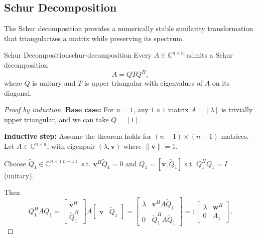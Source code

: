 \subsection{Schur Decomposition}

The Schur decomposition provides a numerically stable similarity transformation that triangularizes a matrix while preserving its spectrum.

\begin{theorem}{Schur Decomposition}{schur-decomposition}
    Every $A \in \mathbb{C}^{n \times n}$ admits a Schur decomposition
    \[
        A = Q T Q^H,
    \]
    where $Q$ is unitary and $T$ is upper triangular with eigenvalues of $A$ on its diagonal.
\end{theorem}

\begin{proof}[Proof by induction]

    \textbf{Base case:}
    For $n=1$, any $1 \times 1$ matrix $A = [\lambda]$ is trivially upper triangular, and we can take $Q = [1]$.

    \textbf{Inductive step:}
    Assume the theorem holds for $(n-1) \times (n-1)$ matrices. Let $A \in \mathbb{C}^{n \times n}$, with eigenpair $(\lambda, \mathbf{v})$ where $\|\mathbf{v}\|=1$.

    Choose $\widetilde{Q}_1 \in \mathbb{C}^{n \times (n-1)}$ s.t. $\mathbf{v}^H \widetilde{Q}_1 = 0$ and $Q_1 = [\mathbf{v}, \widetilde{Q}_1]$ s.t. $Q_1^H Q_1 = I$ (unitary).

    Then
    \[
        Q_1^H A Q_1 =
        \begin{bmatrix}
            \mathbf{v}^H \\
            \widetilde{Q}_1^H
        \end{bmatrix}
        A
        \begin{bmatrix}
            \mathbf{v} & \widetilde{Q}_1
        \end{bmatrix}
        =
        \begin{bmatrix}
            \lambda & \mathbf{v}^H A \widetilde{Q}_1      \\
            0       & \widetilde{Q}_1^H A \widetilde{Q}_1
        \end{bmatrix}
        =:
        \begin{bmatrix}
            \lambda & \mathbf{w}^H \\
            0       & A_1
        \end{bmatrix}.
    \]

\end{proof}

